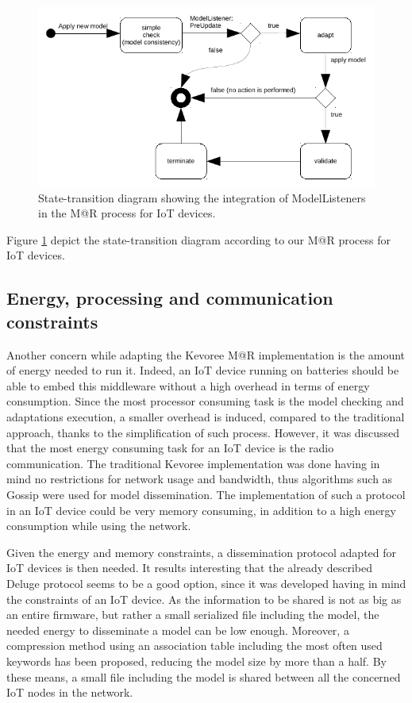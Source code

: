 \begin{figure}[]
	\centering
	\includegraphics[width=0.85\columnwidth]{chapters/modelsAtRuntimeContiki.images/modelListenerIoT.pdf}
	\caption{State-transition diagram showing the integration of ModelListeners in the M@R process for IoT devices.}
	\label{fig:MAR_modelListenerIoT}
\end{figure}

Figure \ref{fig:MAR_modelListenerIoT} depict the state-transition diagram according to our M@R process for IoT devices.

\subsection{Energy, processing and communication constraints}
Another concern while adapting the Kevoree M@R implementation is the amount of energy needed to run it.
Indeed, an IoT device running on batteries should be able to embed this middleware without a high overhead in terms of energy consumption.
Since the most processor consuming task is the model checking and adaptations execution, a smaller overhead is induced, compared to the traditional approach, thanks to the simplification of such process.
However, it was discussed that the most energy consuming task for an IoT device is the radio communication.
The traditional Kevoree implementation was done having in mind no restrictions for network usage and bandwidth, thus algorithms such as Gossip\cite{fouquet2012dissemination} were used for model dissemination.
The implementation of such a protocol in an IoT device could be very memory consuming, in addition to a high energy consumption while using the network.

Given the energy and memory constraints, a dissemination protocol adapted for IoT devices is then needed.
It results interesting that the already described Deluge protocol\cite{hui2004dynamic} seems to be a good option, since it was developed having in mind the constraints of an IoT device.
As the information to be shared is not as big as an entire firmware, but rather a small serialized file including the model, the needed energy to disseminate a model can be low enough.
Moreover, a compression method using an association table including the most often used keywords has been proposed, reducing the model size by more than a half.
By these means, a small file including the model is shared between all the concerned IoT nodes in the network.


